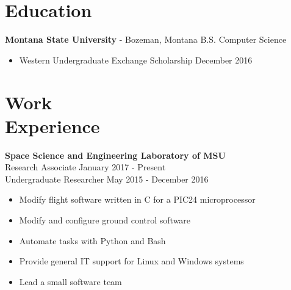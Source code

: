 \documentclass[margin]{res}
\begin{document}
 
 
 
\address{{\bf Present Address} \\ 412 W. Hayes St. \\ Bozeman, MT 59715  \\ (801)-750-4528 \\ \texttt{nevinleh@gmail.com}
        }
\address{{\bf Permanent Address} \\ 3504 Macintosh Cir. \\ Cottonwood Heights, UT 84121 }

 
\begin{resume} 
\noindent\makebox[\linewidth]{\rule{\paperwidth}{0.2pt}}
\section{Education} 
\textbf{Montana State University} -  Bozeman, Montana \hfill B.S. Computer Science 
\begin{itemize} \itemsep -2pt
\item Western Undergraduate Exchange Scholarship \hfill December 2016

\end{itemize}


\noindent\makebox[\linewidth]{\rule{\paperwidth}{0.2pt}}
\section{Work \\ Experience}

{\bf  Space Science and Engineering Laboratory of MSU}  
\\Research Associate    \hfill January 2017 - Present
\\Undergraduate Researcher             \hfill May 2015 - December 2016
\begin{itemize} \itemsep -2pt
	\item Modify flight software written in C for a PIC24 microprocessor
	\item Modify and configure ground control software
	\item Automate tasks with Python and Bash
	\item Provide general IT support for Linux and Windows systems
	\item Lead a small software team
         

\end{itemize}
\end{resume}
\end{document}
